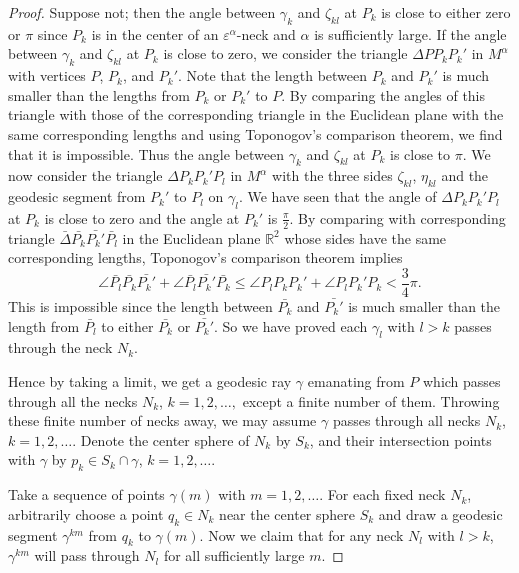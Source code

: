 \begin{proof}
Suppose not; then the angle between $\gamma_k$ and $\zeta_{kl}$ at
$P_k$ is close to either zero or $\pi$ since $P_k$ is in the
center of an $\varepsilon^\alpha$-neck and $\alpha$ is
sufficiently large. If the angle between $\gamma_k$ and
$\zeta_{kl}$ at $P_k$ is close to zero, we consider the triangle
$\Delta PP_kP_k'$ in $M^\alpha$ with vertices $P$, $P_k$, and
$P_k'$. Note that the length between $P_k$ and $P_k'$ is much
smaller than the lengths from $P_k$ or $P_k'$ to $P$. By comparing
the angles of this triangle with those of the corresponding
triangle in the Euclidean plane with the same corresponding
lengths and using Toponogov's comparison theorem, we find that it
is impossible. Thus the angle between $\gamma_k$ and $\zeta_{kl}$
at $P_k$ is close to $\pi$. We now consider the triangle $\Delta
P_kP_k'P_l$ in $M^\alpha$ with the three sides $\zeta_{kl}$,
$\eta_{kl}$ and the geodesic segment from $P_k'$ to $P_l$ on
$\gamma_l$. We have seen that the angle of $\Delta P_k P_k'P_l$ at
$P_k$ is close to zero and the angle at $P_k'$ is $\frac{\pi}{2}$.
By comparing with corresponding triangle
$\bar{\Delta}\bar{P_k}\bar{P_k'}\bar{P_l}$ in the Euclidean plane
$\mathbb{R}^2$ whose sides have the same corresponding lengths,
Toponogov's comparison theorem implies
$$
\angle \bar{P_l}\bar{P_k}\bar{P_k'} +\angle
\bar{P_l}\bar{P_k'}\bar{P_k} \le\angle P_lP_kP_k'+\angle
P_lP_k'P_k<\frac{3}{4}\pi.
$$
This is impossible since the length between $\bar{P_k}$ and
$\bar{P_k'}$ is much smaller than the length from $\bar{P_l}$ to
either $\bar{P_k}$ or $\bar{P_k'}$. So we have proved each
$\gamma_l$ with $l>k$ passes through the neck $N_k$.

Hence by taking a limit, we get a geodesic ray $\gamma$ emanating
from $P$ which passes through all the necks $N_k$, $k = 1, 2,
\ldots,$  except a finite number of them. Throwing these finite
number of necks away, we may assume $\gamma$ passes through all
necks $N_k$, $k=1,2,\ldots.$ Denote the center sphere of $N_k$ by
$S_k$, and their intersection points with $\gamma$ by  $p_{k}\in
S_k\cap \gamma$, $k=1,2,\ldots.$


Take a sequence of points  $\gamma(m)$ with $m=1,2,\ldots.$ For
each fixed neck $N_k$, arbitrarily choose a point $q_{k}\in N_k$
near the center sphere $S_k$ and draw a geodesic segment
$\gamma^{km}$ from $q_{k}$ to $\gamma(m)$. Now we claim that for
any neck $N_l$ with $l>k$, $\gamma^{km}$ will pass through $N_l$
for all sufficiently large $m$.


\end{proof}
